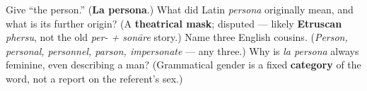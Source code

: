 \begin{tcolorbox}[breakable,colback=teal!4,colframe=teal!35!black,title={Before you move on}]
Give \textquotedblleft{}the person.\textquotedblright{} (\textbf{La persona}.) What did Latin \emph{persona} originally mean, and what is its further origin? (A \textbf{theatrical mask}; disputed — likely \textbf{Etruscan} \emph{phersu}, not the old \emph{per- + sonāre} story.) Name three English cousins. (\emph{Person, personal, personnel, parson, impersonate} — any three.) Why is \emph{la persona} always feminine, even describing a man? (Grammatical gender is a fixed \textbf{category} of the word, not a report on the referent's sex.)
\end{tcolorbox}
